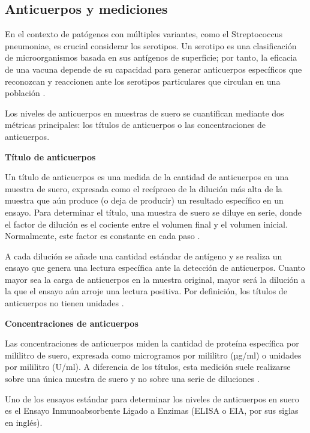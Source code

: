 \subsection{Anticuerpos y mediciones}

En el contexto de patógenos con múltiples variantes, como el Streptococcus pneumoniae, es crucial considerar los serotipos. Un serotipo es una clasificación de microorganismos basada en sus antígenos de superficie; por tanto, la eficacia de una vacuna depende de su capacidad para generar anticuerpos específicos que reconozcan y reaccionen ante los serotipos particulares que circulan en una población \cite{nauta2020}.

Los niveles de anticuerpos en muestras de suero se cuantifican mediante dos métricas principales: los títulos de anticuerpos o las concentraciones de anticuerpos.

\vspace{\baselineskip}
\textbf{Título de anticuerpos}
\vspace{\baselineskip}

Un título de anticuerpos es una medida de la cantidad de anticuerpos en una muestra de suero, expresada como el recíproco de la dilución más alta de la muestra que aún produce (o deja de producir) un resultado específico en un ensayo. Para determinar el título, una muestra de suero se diluye en serie, donde el factor de dilución es el cociente entre el volumen final y el volumen inicial. Normalmente, este factor es constante en cada paso \cite{nauta2020}.

A cada dilución se añade una cantidad estándar de antígeno y se realiza un ensayo que genera una lectura específica ante la detección de anticuerpos. Cuanto mayor sea la carga de anticuerpos en la muestra original, mayor será la dilución a la que el ensayo aún arroje una lectura positiva. Por definición, los títulos de anticuerpos no tienen unidades \cite{nauta2020}.

\vspace{\baselineskip}
\textbf{Concentraciones de anticuerpos}
\vspace{\baselineskip}

Las concentraciones de anticuerpos miden la cantidad de proteína específica por mililitro de suero, expresada como microgramos por mililitro (µg/ml) o unidades por mililitro (U/ml). A diferencia de los títulos, esta medición suele realizarse sobre una única muestra de suero y no sobre una serie de diluciones \cite{nauta2020}.

Uno de los ensayos estándar para determinar los niveles de anticuerpos en suero es el Ensayo Inmunoabsorbente Ligado a Enzimas (ELISA o EIA, por sus siglas en inglés).

